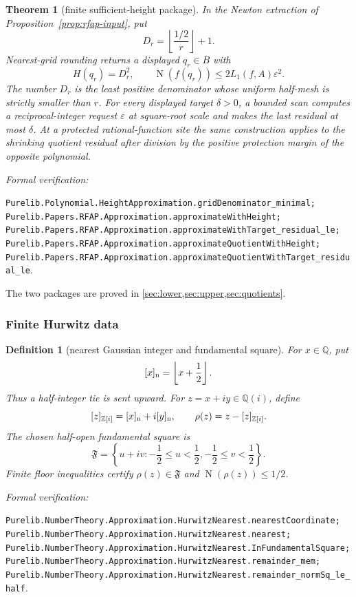 \documentclass[11pt]{article}
\newtheorem{theorem}{Theorem}[section]
\newtheorem{definition}[definition]{Definition}
\newcommand{\Qi}{\mathbb{Q}(i)}
\newcommand{\Zi}{\mathbb{Z}[i]}
\newcommand{\Q}{\mathbb{Q}}
\newcommand{\Norm}[1]{\operatorname{N}\!\left(#1\right)}
\newcommand{\eps}{\varepsilon}
\newcommand{\leanref}[1]{\par\smallskip\noindent
  \emph{Formal verification:}\par\nobreak
  {\raggedright\nolinkurl{#1}.\par}}
\begin{document}
\begin{theorem}[finite sufficient-height package]
\label{thm:sufficient-height-package}
In the Newton extraction of Proposition~\ref{prop:rfap-input}, put
\[
 D_r=\left\lfloor\frac{1/2}{r}\right\rfloor+1.
\]
Nearest-grid rounding returns a displayed $q_r\in B$ with
\[
 H(q_r)=D_r^2,
 \qquad \Norm{f(q_r)}\le2L_1(f,A)\eps^2.
\]
The number $D_r$ is the least positive denominator whose uniform half-mesh
is strictly smaller than $r$.  For every displayed target $\delta>0$, a
bounded scan computes a reciprocal-integer request $\eps$ at square-root
scale and makes the last residual at most $\delta$.  At a protected
rational-function site the same construction applies to the shrinking
quotient residual after division by the positive protection margin of the
opposite polynomial.
\end{theorem}

\leanref{Purelib.Polynomial.HeightApproximation.gridDenominator_minimal;
Purelib.Papers.RFAP.Approximation.approximateWithHeight;
Purelib.Papers.RFAP.Approximation.approximateWithTarget_residual_le;
Purelib.Papers.RFAP.Approximation.approximateQuotientWithHeight;
Purelib.Papers.RFAP.Approximation.approximateQuotientWithTarget_residual_le}

The two packages are proved in
\cref{sec:lower,sec:upper,sec:quotients}.

\subsubsection{Finite Hurwitz data}

\begin{definition}[nearest Gaussian integer and fundamental square]
\label{def:nearest-gaussian}
For $x\in\Q$, put
\[
                  [x]_{\rm n}=\left\lfloor x+\frac12\right\rfloor.
\]
Thus a half-integer tie is sent upward.  For $z=x+iy\in\Qi$, define
\[
 [z]_{\Zi}=[x]_{\rm n}+i[y]_{\rm n},
 \qquad
 \rho(z)=z-[z]_{\Zi}.
\]
The chosen half-open fundamental square is
\begin{equation}
\label{eq:fundamental-square}
 \mathfrak F=
 \left\{u+iv:-\frac12\le u<\frac12,
                  -\frac12\le v<\frac12\right\}.
\end{equation}
Finite floor inequalities certify $\rho(z)\in\mathfrak F$ and
$\Norm{\rho(z)}\le1/2$.
\end{definition}

\leanref{Purelib.NumberTheory.Approximation.HurwitzNearest.nearestCoordinate;
Purelib.NumberTheory.Approximation.HurwitzNearest.nearest;
Purelib.NumberTheory.Approximation.HurwitzNearest.InFundamentalSquare;
Purelib.NumberTheory.Approximation.HurwitzNearest.remainder_mem;
Purelib.NumberTheory.Approximation.HurwitzNearest.remainder_normSq_le_half}
\end{document}
